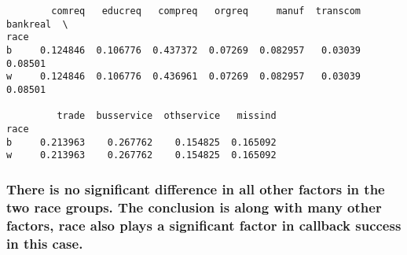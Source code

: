 \documentclass[11pt]{article}
\begin{document}
\begin{verbatim}
        comreq   educreq   compreq   orgreq     manuf  transcom  bankreal  \
race                                                                        
b     0.124846  0.106776  0.437372  0.07269  0.082957   0.03039   0.08501   
w     0.124846  0.106776  0.436961  0.07269  0.082957   0.03039   0.08501   

         trade  busservice  othservice   missind  
race                                              
b     0.213963    0.267762    0.154825  0.165092  
w     0.213963    0.267762    0.154825  0.165092  
    \end{verbatim}

    
    \subsubsection{There is no significant difference in all other factors
in the two race groups. The conclusion is along with many other factors,
race also plays a significant factor in callback success in this
case.}\label{there-is-no-significant-difference-in-all-other-factors-in-the-two-race-groups.-the-conclusion-is-along-with-many-other-factors-race-also-plays-a-significant-factor-in-callback-success-in-this-case.}


    
    
    
    
\end{document}
